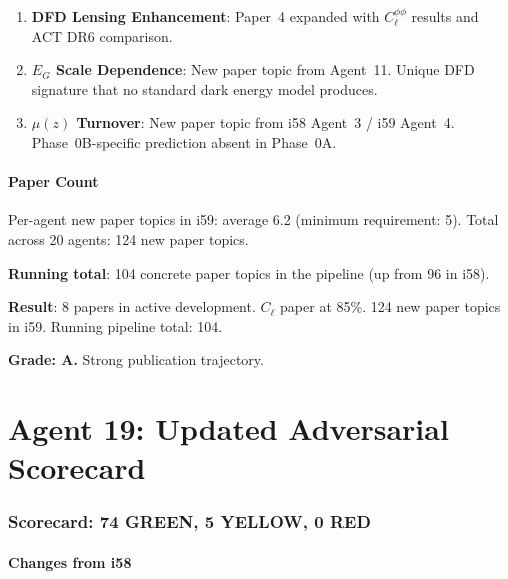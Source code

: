 \documentclass[11pt,a4paper]{article}
\newcommand{\GREEN}{\textcolor{dfdgreen}{\textbf{GREEN}}}
\newcommand{\YELLOW}{\textcolor{dfdyellow}{\textbf{YELLOW}}}
\newcommand{\RED}{\textcolor{dfdred}{\textbf{RED}}}
\begin{document}
\begin{enumerate}
\item \textbf{DFD Lensing Enhancement}: Paper~4 expanded with $C_\ell^{\phi\phi}$ results and ACT DR6 comparison.
\item \textbf{$E_G$ Scale Dependence}: New paper topic from Agent~11. Unique DFD signature that no standard dark energy model produces.
\item \textbf{$\mu(z)$ Turnover}: New paper topic from i58 Agent~3 / i59 Agent~4. Phase~0B-specific prediction absent in Phase~0A.
\end{enumerate}

\subsection{Paper Count}

Per-agent new paper topics in i59: average 6.2 (minimum requirement: 5). Total across 20 agents: 124 new paper topics.

\textbf{Running total}: 104 concrete paper topics in the pipeline (up from 96 in i58).

\begin{tcolorbox}[colback=green!5!white, colframe=green!60!black, title={Agent 18: Paper Pipeline --- 8 Active Papers, 104 Topics}]
\textbf{Result}: 8 papers in active development. $C_\ell$ paper at 85\%. 124 new paper topics in i59. Running pipeline total: 104.

\textbf{Grade: A.} Strong publication trajectory.
\end{tcolorbox}


\part{Agent 19: Updated Adversarial Scorecard}
\label{part:scorecard}

\section{Scorecard: 74 \GREEN, 5 \YELLOW, 0 \RED}

\subsection{Changes from i58}
\end{document}
